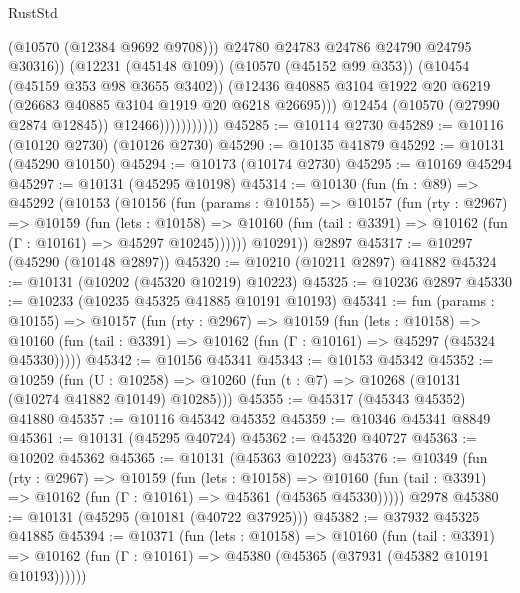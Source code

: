 \begin{lexlean}{RustStd}
\begin{coremodule}
                                  (@10570 (@12384 @9692 @9708)))
                                @24780
                                @24783
                                @24786
                                @24790
                                @24795
                                @30316))
                            (@12231 (@45148 @109))
                            (@10570 (@45152 @99 @353))
                            (@10454 (@45159 @353 @98 @3655 @3402))
                            (@12436
                              @40885
                              @3104
                              @1922
                              @20
                              @6219
                              (@26683 @40885 @3104 @1919 @20 @6218 @26695)))
                          @12454
                          (@10570 (@27990 @2874 @12845))
                          @12466)))))))))))
@45285 := @10114 @2730
@45289 := @10116 (@10120 @2730) (@10126 @2730)
@45290 := @10135 @41879
@45292 := @10131 (@45290 @10150)
@45294 := @10173 (@10174 @2730)
@45295 := @10169 @45294
@45297 := @10131 (@45295 @10198)
@45314 := @10130
    (fun (fn : @89) =>
    @45292
      (@10153
        (@10156
          (fun (params : @10155) =>
          @10157
            (fun (rty : @2967) =>
            @10159
              (fun (lets : @10158) =>
              @10160 (fun (tail : @3391) => @10162 (fun (Γ : @10161) => @45297 @10245))))))
        @10291))
    @2897
@45317 := @10297 (@45290 (@10148 @2897))
@45320 := @10210 (@10211 @2897) @41882
@45324 := @10131 (@10202 (@45320 @10219) @10223)
@45325 := @10236 @2897
@45330 := @10233 (@10235 @45325 @41885 @10191 @10193)
@45341 := fun (params : @10155) =>
  @10157
    (fun (rty : @2967) =>
    @10159
      (fun (lets : @10158) =>
      @10160 (fun (tail : @3391) => @10162 (fun (Γ : @10161) => @45297 (@45324 @45330)))))
@45342 := @10156 @45341
@45343 := @10153 @45342
@45352 := @10259
    (fun (U : @10258) => @10260 (fun (t : @7) => @10268 (@10131 (@10274 @41882 @10149) @10285)))
@45355 := @45317 (@45343 @45352) @41880
@45357 := @10116 @45342 @45352
@45359 := @10346 @45341 @8849
@45361 := @10131 (@45295 @40724)
@45362 := @45320 @40727
@45363 := @10202 @45362
@45365 := @10131 (@45363 @10223)
@45376 := @10349
    (fun (rty : @2967) =>
    @10159
      (fun (lets : @10158) =>
      @10160 (fun (tail : @3391) => @10162 (fun (Γ : @10161) => @45361 (@45365 @45330)))))
    @2978
@45380 := @10131 (@45295 (@10181 (@40722 @37925)))
@45382 := @37932 @45325 @41885
@45394 := @10371
    (fun (lets : @10158) =>
    @10160
      (fun (tail : @3391) =>
      @10162 (fun (Γ : @10161) => @45380 (@45365 (@37931 (@45382 @10191 @10193))))))

\end{coremodule}
\end{lexlean}
